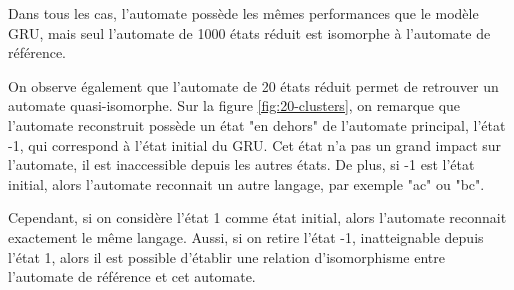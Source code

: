 \documentclass{article}
\begin{document}
Dans tous les cas, l'automate possède les mêmes performances que le modèle GRU, mais seul l'automate de 1000 états réduit est
isomorphe à l'automate de référence. 
\par On observe également que l'automate de 20 états réduit permet de retrouver un automate 
quasi-isomorphe. Sur la figure \ref{fig:20-clusters}, on remarque que l'automate reconstruit possède un état
"en dehors" de l'automate principal, l'état -1, qui correspond à l'état initial du GRU. Cet état n'a pas un grand impact 
sur l'automate, il est inaccessible depuis les autres états. De plus, si -1 est l'état initial, alors l'automate 
reconnait un autre langage, par exemple "ac" ou "bc".
\par Cependant, si on considère l'état 1 comme état initial, alors l'automate reconnait exactement le même langage. Aussi, si on
retire l'état -1, inatteignable depuis l'état 1, alors il est possible d'établir une relation d'isomorphisme entre l'automate 
de référence et cet automate.
\end{document}

